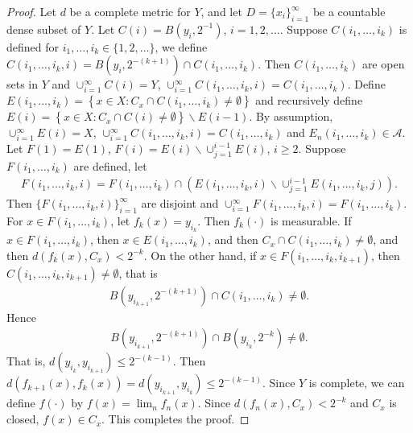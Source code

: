 \documentclass[11pt]{article}
\theoremstyle{plain}
\theoremstyle{definition}
\theoremstyle{remark}
\begin{document}
\begin{proof}
    Let $d$ be a complete metric for $Y$, and let $D=\{x_i\}_{i=1}^\infty$ be a countable dense subset of $Y$.
    Let $C(i) = B(y_i, 2^{-1})$, $i=1,2,\dots$.
    Suppose $C(i_1,\dots,i_k)$ is defined for $i_1,\dots,i_k \in \{1,2,\dots\}$, we define $C(i_1,\dots,i_k , i)= B(y_i, 2^{-(k+1)})\cap C(i_1,\dots,i_k)$.
    Then $C(i_1,\dots,i_k)$ are open sets in $Y$ and $\cup_{i=1}^\infty C(i) = Y$, $\cup_{i=1}^\infty C(i_1,\dots,i_k, i) = C(i_1,\dots,i_k)$.
    Define $E(i_1,\dots,i_k) = \left\{ x\in X : C_x \cap C(i_1,\dots,i_k) \neq \emptyset \right\}$ and recursively define $E(i) = \left\{ x\in X : C_x \cap C(i) \neq \emptyset \right\} \backslash E(i-1) $.
    By assumption, $\cup_{i=1}^\infty E(i) = X$, $\cup_{i=1}^\infty C(i_1,\dots,i_k , i) = C(i_1,\dots,i_k)$ and $E_n(i_1,\dots,i_k) \in \mathscr A$.
    Let $F(1)=E(1)$, $F(i)=E(i)\backslash \cup_{j=1}^{i-1} E(i)$, $i\geq 2$.
    Suppose $F(i_1,\dots,i_k)$ are defined, let
    \begin{align*}
        F(i_1,\dots,i_k, i)= F(i_1,\dots,i_k) \cap \left(  E(i_1,\dots,i_k, i) \backslash \cup_{j=1}^{i-1} E(i_1,\dots,i_k ,j)  \right).
    \end{align*}
    Then $\{F(i_1,\dots,i_k,i)\}_{i=1}^\infty$ are disjoint and $\cup_{i=1}^\infty F(i_1,\dots,i_k ,i ) = F(i_1,\dots,i_k)$.
    For $x \in F(i_1,\dots,i_k)$, let $f_k (x) = y_{i_k}$.
    Then $f_k (\cdot)$ is measurable.
    If $x \in F(i_1,\dots,i_k)$, then $x \in E(i_1,\dots,i_k)$, and then $C_x \cap C(i_1,\dots,i_k) \neq \emptyset$, and then 
    $d(f_k(x), C_x) < 2^{-k}$.
    On the other hand, 
    if $x \in F(i_1,\dots,i_k,i_{k+1})$, then $C(i_1,\dots,i_k, i_{k+1}) \neq \emptyset$, that is
    \begin{align*}
        B(y_{i_{k+1}}, 2^{-(k+1)}) \cap C(i_1,\dots,i_k) \neq \emptyset.
    \end{align*}
    Hence
    \begin{align*}
        B(y_{i_{k+1}}, 2^{-(k+1)}) \cap B(y_{i_k}, 2^{-k}) \neq \emptyset.
    \end{align*}
    That is, $d(y_{i_{k}}, y_{i_{k+1}})\leq 2^{-(k-1)} $.
    Then $d(f_{k+1}(x), f_k (x)) =d(y_{i_{k+1}},y_{i_k}) \leq 2^{-(k-1)} $.
    Since $Y$ is complete, we can define $f(\cdot)$ by $f(x) = \lim_n f_n(x)$.
    Since $d(f_n(x),C_x) < 2^{-k}$ and $C_x$ is closed, $f(x) \in C_x$.
    This completes the proof.

    
    
\end{proof}




\end{document}
